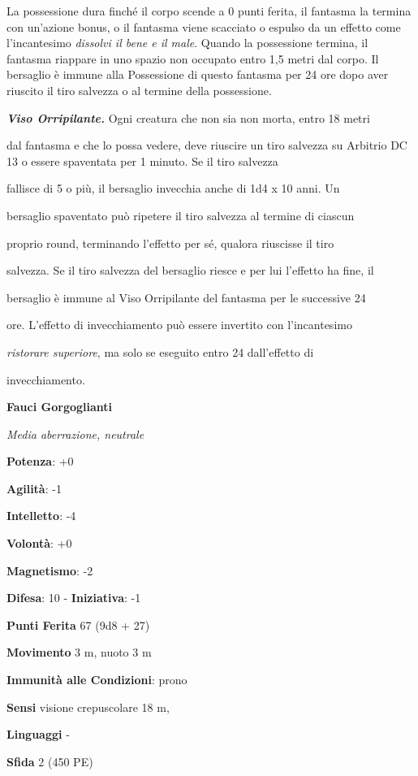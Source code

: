 \begin{multicols}{2}
La possessione dura finché il corpo scende a 0 punti ferita, il fantasma
la termina con un'azione bonus, o il fantasma viene scacciato o espulso
da un effetto come l'incantesimo \emph{dissolvi il bene e il male}.
Quando la possessione termina, il fantasma riappare in uno spazio non
occupato entro 1,5 metri dal corpo. Il bersaglio è immune alla
Possessione di questo fantasma per 24 ore dopo aver riuscito il tiro
salvezza o al termine della possessione.

\emph{\textbf{Viso Orripilante.}} Ogni creatura che non sia non morta,
entro 18 metri

dal fantasma e che lo possa vedere, deve riuscire un tiro salvezza su Arbitrio DC 13 o essere spaventata per 1 minuto. Se il tiro salvezza

fallisce di 5 o più, il bersaglio invecchia anche di 1d4 x 10 anni. Un

bersaglio spaventato può ripetere il tiro salvezza al termine di ciascun

proprio round, terminando l'effetto per sé, qualora riuscisse il tiro

salvezza. Se il tiro salvezza del bersaglio riesce e per lui l'effetto
ha fine, il

bersaglio è immune al Viso Orripilante del fantasma per le successive 24

ore. L'effetto di invecchiamento può essere invertito con l'incantesimo

\emph{ristorare superiore}, ma solo se eseguito entro 24 dall'effetto di

invecchiamento.

\textbf{Fauci Gorgoglianti}

\emph{Media aberrazione, neutrale}

\textbf{Potenza}: +0

\textbf{Agilità}: -1

\textbf{Intelletto}: -4

\textbf{Volontà}: +0

\textbf{Magnetismo}: -2

\textbf{Difesa}: 10 - \textbf{Iniziativa}: -1

\textbf{Punti Ferita} 67 (9d8 + 27)

\textbf{Movimento} 3 m, nuoto 3 m

\textbf{Immunità alle Condizioni}: prono

\textbf{Sensi} visione crepuscolare 18 m, 

\textbf{Linguaggi} -

\textbf{Sfida} 2 (450 PE)\smallskip


\end{multicols}
